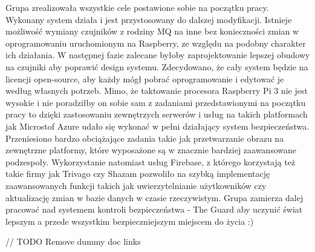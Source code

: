 Grupa zrealizowała wszystkie cele postawione sobie na początku pracy. Wykonany system działa i jest przystosowany do dalszej modyfikacji. Istnieje możliwość wymiany czujników z rodziny MQ na inne bez konieczności zmian w oprogramowaniu uruchomionym na Raspberry, ze względu na podobny charakter ich działania. W następnej fazie zalecane byłoby zaprojektowanie lepszej obudowy na czujniki aby poprawić design systemu. Zdecydowano, że cały system będzie na licencji open-source, aby każdy mógł pobrać oprogramowanie i edytować je według własnych potrzeb. Mimo, że taktowanie procesora Raspberry Pi 3 nie jest wysokie i nie poradziłby on sobie sam z zadaniami przedstawionymi na początku pracy to dzięki zastosowaniu zewnętrzych serwerów i usług na takich platformach jak Microstof Azure udało się wykonać w pełni działający system bezpieczeństwa. Przeniesiono bardzo obciążające zadania takie jak przetwarzanie obrazu na zewnętrzne platformy, które wyposażone są w znacznie bardziej zaawansowane podzespoły. Wykorzystanie natomiast usług Firebase, z którego korzystają też takie firmy jak Trivago czy Shazam pozwoliło na szybką implementację zaawansowanych funkcji takich jak uwierzytelnianie użytkowników czy aktualizację zmian w bazie danych w czasie rzeczywistym. Grupa zamierza dalej pracować nad systemem kontroli bezpieczeństwa - The Guard aby uczynić świat lepszym a przede wszystkim bezpieczniejszym miejscem do życia :)


// TODO Remove dummy doc links
\cite{MDESIGN}
\cite{RXJAVA}
\cite{KOTLIN}
\cite{RPI}
\cite{firebase}
\cite{android}
\cite{azure}
\cite{kotlin}